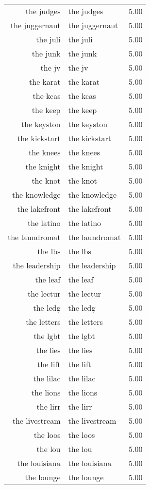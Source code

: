 \begin{table}[ht]
\begin{tabular}{rlr}
  the judges & the judges & 5.00 \\ 
  the juggernaut & the juggernaut & 5.00 \\ 
  the juli & the juli & 5.00 \\ 
  the junk & the junk & 5.00 \\ 
  the jv & the jv & 5.00 \\ 
  the karat & the karat & 5.00 \\ 
  the kcas & the kcas & 5.00 \\ 
  the keep & the keep & 5.00 \\ 
  the keyston & the keyston & 5.00 \\ 
  the kickstart & the kickstart & 5.00 \\ 
  the knees & the knees & 5.00 \\ 
  the knight & the knight & 5.00 \\ 
  the knot & the knot & 5.00 \\ 
  the knowledge & the knowledge & 5.00 \\ 
  the lakefront & the lakefront & 5.00 \\ 
  the latino & the latino & 5.00 \\ 
  the laundromat & the laundromat & 5.00 \\ 
  the lbs & the lbs & 5.00 \\ 
  the leadership & the leadership & 5.00 \\ 
  the leaf & the leaf & 5.00 \\ 
  the lectur & the lectur & 5.00 \\ 
  the ledg & the ledg & 5.00 \\ 
  the letters & the letters & 5.00 \\ 
  the lgbt & the lgbt & 5.00 \\ 
  the lies & the lies & 5.00 \\ 
  the lift & the lift & 5.00 \\ 
  the lilac & the lilac & 5.00 \\ 
  the lions & the lions & 5.00 \\ 
  the lirr & the lirr & 5.00 \\ 
  the livestream & the livestream & 5.00 \\ 
  the loos & the loos & 5.00 \\ 
  the lou & the lou & 5.00 \\ 
  the louisiana & the louisiana & 5.00 \\ 
  the lounge & the lounge & 5.00 \\ 

\end{tabular}
\end{table}
